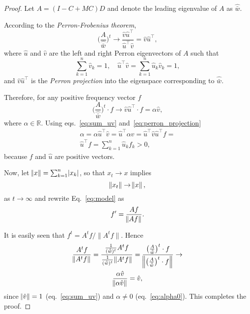 \documentclass[12pt, twocolumn]{extarticle}
\newcommand*{\tr}{^\intercal}
\newcommand{\goesto}{\rightarrow}
\begin{document}
\begin{proof}
Let $A=(I-C+MC)D$ and denote the leading eigenvalue of $A$ as $\hat{\bar w}$.

According to the \emph{Perron-Frobenius theorem}, 
\begin{equation}
\bigg(\frac{A}{\hat{\bar w}}\bigg)^t \goesto \frac{\hat v \hat u\tr}{\hat u\tr \hat v} = \hat v \hat u\tr,
\end{equation}
where $\hat u$ and $\hat v$ are the left and right Perron eigenvectors of $A$ such that 
\begin{equation}
\sum_{k=1}^{n}{\hat v_k}=1, \quad
\hat u\tr \hat v=\sum_{k=1}^{n}{\hat u_k \hat v_k}=1,
\label{eq:sum_uv}
\end{equation}
and $\hat v \hat u\tr$ is the \emph{Perron projection} into the eigenspace corresponding to $\hat{\bar w}$.

Therefore, for any positive frequency vector $f$
\begin{equation}
\bigg(\frac{A}{\hat{\bar w}}\bigg)^t \cdot f \goesto \hat v \hat u\tr \cdot f = \alpha \hat v,
\label{eq:perron_projection}
\end{equation}
where $\alpha \in \mathbb{R}$.
Using eqs.~\ref{eq:sum_uv} and~\ref{eq:perron_projection}
\begin{equation}
\begin{aligned}
\alpha = \alpha \hat u\tr \hat v = 
\hat u\tr \alpha \hat v = 
\hat u\tr \hat v \hat u\tr f = \\
\hat u\tr f = 
\sum_{k=1}^{n}{\hat u_k f_k} > 0,
\label{eq:alpha0}
\end{aligned}
\end{equation}
because $f$ and $\hat u$ are positive vectors.

Now, let $\norm{x} = \sum_{k=1}^{n}\abs{x_k}$, so that $x_t \goesto x$ implies
\begin{equation}
\norm{x_t} \goesto \norm{x},
\label{eq:norm_limit}
\end{equation}
as $t \goesto \infty$ and rewrite Eq.~\ref{eq:model} as 
\begin{equation}
f' = \frac{A f}{\norm{A f}}. 
\label{eq:model_norm}
\end{equation}

It is easily seen that $f^t =A^tf/\|A^tf\|$. Hence 
\begin{multline}
\frac{A^t f}{\norm{A^t f}} = 
\frac{\frac{1}{(\hat{\bar w})^t} A^t f}{\frac{1}{(\hat{\bar w})^t} \norm{A^t f}} = 
\frac{\big(\frac{A}{\hat{\bar w}}\big)^t \cdot f }{ \norm{ \big(\frac{A}{\hat{\bar w}}\big)^t \cdot f }} \goesto \\
\frac{\alpha \hat v}{\norm{\alpha \hat v}} = \hat v,
\end{multline}
since $\norm{\hat v}=1$ (eq.~\ref{eq:sum_uv}) and $\alpha \ne 0$ (eq.~\ref{eq:alpha0}).
This completes the proof.
\end{proof}
\end{document}
